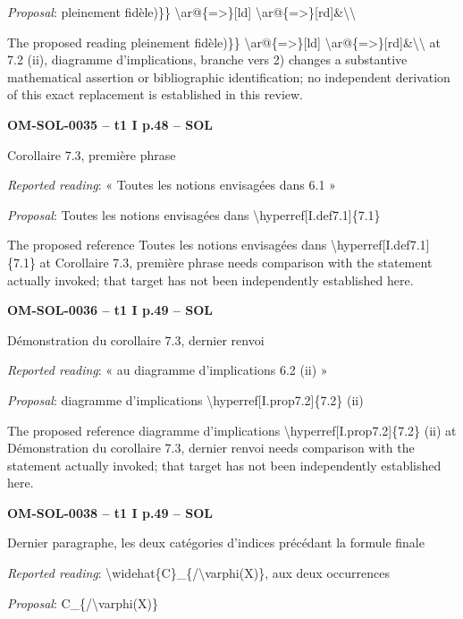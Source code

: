 \emph{Proposal}: pleinement fidèle)\}\} \textbackslash{}ar@\{=\allowbreak >\}[ld] \textbackslash{}ar@\{=\allowbreak >\}[rd]\&\textbackslash{}\textbackslash{}\par
The proposed reading pleinement fidèle)\}\} \textbackslash{}ar@\{=\allowbreak >\}[ld] \textbackslash{}ar@\{=\allowbreak >\}[rd]\&\textbackslash{}\textbackslash{} at 7.2 (ii), diagramme d'implications, branche vers 2) changes a substantive mathematical assertion or bibliographic identification; no independent derivation of this exact replacement is established in this review.\par
\par\noindent\textbf{OM-SOL-0035 -- t1 I p.48 -- SOL}\par
Corollaire 7.3, première phrase\par
\emph{Reported reading}: « Toutes les notions envisagées dans 6.1 »\par
\emph{Proposal}: Toutes les notions envisagées dans \textbackslash{}hyperref[I.def7.1]\{7.1\}\par
The proposed reference Toutes les notions envisagées dans \textbackslash{}hyperref[I.def7.1]\{7.1\} at Corollaire 7.3, première phrase needs comparison with the statement actually invoked; that target has not been independently established here.\par
\par\noindent\textbf{OM-SOL-0036 -- t1 I p.49 -- SOL}\par
Démonstration du corollaire 7.3, dernier renvoi\par
\emph{Reported reading}: « au diagramme d'implications 6.2 (ii) »\par
\emph{Proposal}: diagramme d'implications \textbackslash{}hyperref[I.prop7.2]\{7.2\} (ii)\par
The proposed reference diagramme d'implications \textbackslash{}hyperref[I.prop7.2]\{7.2\} (ii) at Démonstration du corollaire 7.3, dernier renvoi needs comparison with the statement actually invoked; that target has not been independently established here.\par
\par\noindent\textbf{OM-SOL-0038 -- t1 I p.49 -- SOL}\par
Dernier paragraphe, les deux catégories d'indices précédant la formule finale\par
\emph{Reported reading}: \textbackslash{}widehat\{C\}\_\{/\textbackslash{}varphi(X)\}, aux deux occurrences\par
\emph{Proposal}: C\_\{/\textbackslash{}varphi(X)\}\par
